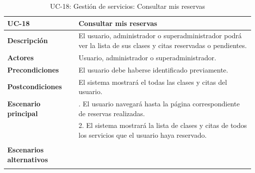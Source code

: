 \begin{table}
  \begin{center}
    \begin{tabularx}{16.4cm}{|l|X|}
      \hline
      \textbf{UC-18} & \textbf{Consultar mis reservas}\\
      \hline
      \textbf{Descripción} & El usuario, administrador o superadministrador podrá ver la lista de sus clases y citas reservadas o pendientes. \\
      \hline
      \textbf{Actores} & Usuario, administrador o superadministrador. \\
      \hline
      \textbf{Precondiciones} & El usuario debe haberse identificado previamente.\\
      \hline
      \textbf{Postcondiciones} & El sistema mostrará el todas las clases y citas del usuario.\\
      \hline
      \textbf{Escenario principal} & \smallskip 1. El usuario navegará hasta la página correspondiente de reservas realizadas.\\
      & 2. El sistema mostrará la lista de clases y citas de todos los servicios que el usuario haya reservado.\\
      & \\
      \hline
      \textbf{Escenarios alternativos} & \\
      & \\
      \hline
    \end{tabularx}
    \caption{UC-18: Gestión de servicios: Consultar mis reservas}
    \label{tab:CU-reservas}
  \end{center}
\end{table}


